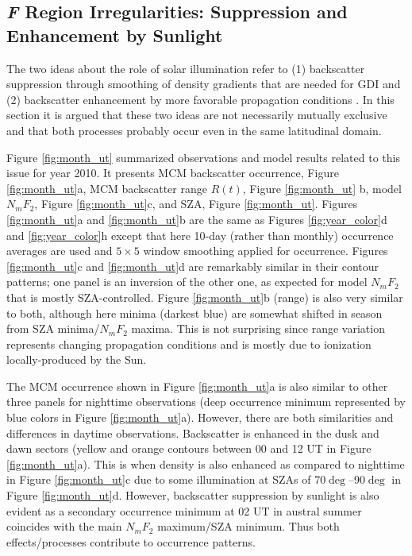 \subsection{\textit{F} Region Irregularities: Suppression and Enhancement by Sunlight}

The two ideas about the role of solar illumination refer to (1) backscatter suppression through smoothing of density gradients that are needed for GDI \citep{Ruohoniemi1997,Koustov2004} and (2) backscatter enhancement by more favorable propagation conditions \citep{Bristow2011,Koustov2014}. In this section it is argued that these two ideas are not necessarily mutually exclusive and that both processes probably occur even in the same latitudinal domain.

Figure \ref{fig:month_ut} summarized observations and model results related to this issue for year 2010. It presents MCM backscatter occurrence, Figure \ref{fig:month_ut}a, MCM backscatter range \(R(t)\), Figure \ref{fig:month_ut} b, model \(N_mF_2\), Figure \ref{fig:month_ut}c, and SZA, Figure \ref{fig:month_ut}. Figures \ref{fig:month_ut}a and \ref{fig:month_ut}b are the same as Figures \ref{fig:year_color}d and \ref{fig:year_color}h except that here 10-day (rather than monthly) occurrence averages are used and \(5\times5\) window smoothing applied for occurrence. Figures \ref{fig:month_ut}c and \ref{fig:month_ut}d are remarkably similar in their contour patterns; one panel is an inversion of the other one, as expected for model \(N_mF_2\) that is mostly SZA-controlled.  Figure \ref{fig:month_ut}b (range) is also very similar to both, although here minima (darkest blue) are somewhat shifted in season from SZA minima/\(N_mF_2\) maxima. This is not surprising since range variation represents changing propagation conditions and is mostly due to ionization locally-produced by the Sun.

The MCM occurrence shown in Figure \ref{fig:month_ut}a is also similar to other three panels for nighttime observations (deep occurrence minimum represented by blue colors in Figure \ref{fig:month_ut}a). However, there are both similarities and differences in daytime observations. Backscatter is enhanced in the dusk and dawn sectors (yellow and orange contours between 00 and 12 UT in Figure \ref{fig:month_ut}a). This is when density is also enhanced as compared to nighttime in Figure \ref{fig:month_ut}c due to some illumination at SZAs of 70\(\deg\)--90\(\deg\) in Figure \ref{fig:month_ut}d. However, backscatter suppression by sunlight is also evident as a secondary occurrence minimum at 02 UT in austral summer coincides with the main \(N_mF_2\) maximum/SZA minimum. Thus both effects/processes contribute to occurrence patterns.

